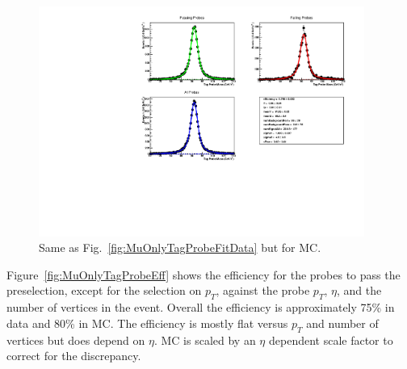 \begin{figure}
 \begin{center}
  \includegraphics[width=0.95\textwidth]{figures/muonly/FitCanvasMCEtaBin6}
 \end{center}
 \caption[Example fits to invariant mass distributions
in the tag and probe procedure for the \muononly\ analysis for MC.]
{Same as Fig.~\ref{fig:MuOnlyTagProbeFitData} but for MC.}
    \label{fig:MuOnlyTagProbeFitMC}
\end{figure}

Figure~\ref{fig:MuOnlyTagProbeEff} shows the efficiency for the probes
to pass the preselection, except for the selection on $p_T$, against the probe
$p_T$, $\eta$, and the number of vertices in the event.
Overall the efficiency is approximately 75\% in data and 80\% in MC.
The efficiency is mostly flat versus $p_T$ and number of vertices but does depend
on $\eta$.  MC is scaled by an $\eta$ dependent scale factor to correct for the discrepancy.

